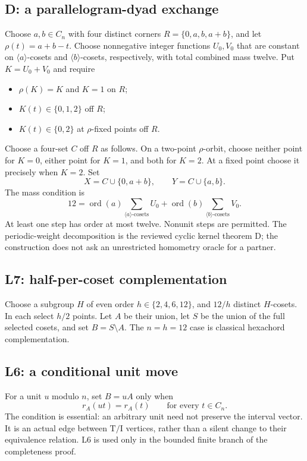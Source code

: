 \documentclass[11pt]{article}
\theoremstyle{remark}
\newcommand{\TI}{\mathrm{T/I}}
\newcommand{\ord}{\operatorname{ord}}
\begin{document}
\subsection{D: a parallelogram-dyad exchange}
Choose $a,b\in C_n$ with four distinct corners
$R=\{0,a,b,a+b\}$, and let $\rho(t)=a+b-t$.
Choose nonnegative integer functions $U_0,V_0$ that are constant on
$\langle a\rangle$-cosets and $\langle b\rangle$-cosets, respectively,
with total combined mass twelve. Put $K=U_0+V_0$ and require
\begin{itemize}
\item $\rho(K)=K$ and $K=1$ on $R$;
\item $K(t)\in\{0,1,2\}$ off $R$;
\item $K(t)\in\{0,2\}$ at $\rho$-fixed points off $R$.
\end{itemize}
Choose a four-set $C$ off $R$ as follows. On a two-point $\rho$-orbit,
choose neither point for $K=0$, either point for $K=1$, and both for
$K=2$. At a fixed point choose it precisely when $K=2$. Set
\[
 X=C\cup\{0,a+b\},\qquad Y=C\cup\{a,b\}.
\]
The mass condition is
\[
12=\ord(a)\sum_{\langle a\rangle\text{-cosets}}U_0
 +\ord(b)\sum_{\langle b\rangle\text{-cosets}}V_0.
\]
At least one step has order at most twelve. Nonunit steps are permitted.
The periodic-weight decomposition is the reviewed cyclic kernel theorem D;
the construction does not ask an unrestricted homometry oracle for a partner.

\subsection{L7: half-per-coset complementation}
Choose a subgroup $H$ of even order $h\in\{2,4,6,12\}$, and $12/h$
distinct $H$-cosets. In each select $h/2$ points. Let $A$ be their union,
let $S$ be the union of the full selected cosets, and set $B=S\setminus A$.
The $n=h=12$ case is classical hexachord complementation.

\subsection{L6: a conditional unit move}
For a unit $u$ modulo $n$, set $B=uA$ only when
\[
 r_A(ut)=r_A(t)\qquad\text{for every }t\in C_n.
\]
The condition is essential: an arbitrary unit need not preserve the
interval vector. It is an actual edge between $\TI$ vertices, rather than
a silent change to their equivalence relation. L6 is used only in the
bounded finite branch of the completeness proof.
\end{document}
